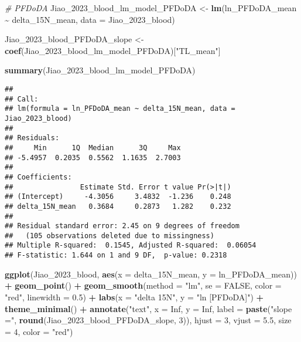 \documentclass[
]{article}
\newenvironment{Shaded}{\begin{snugshade}}{\end{snugshade}}
\newcommand{\AttributeTok}[1]{\textcolor[rgb]{0.13,0.29,0.53}{#1}}
\newcommand{\CommentTok}[1]{\textcolor[rgb]{0.56,0.35,0.01}{\textit{#1}}}
\newcommand{\ConstantTok}[1]{\textcolor[rgb]{0.56,0.35,0.01}{#1}}
\newcommand{\DecValTok}[1]{\textcolor[rgb]{0.00,0.00,0.81}{#1}}
\newcommand{\FloatTok}[1]{\textcolor[rgb]{0.00,0.00,0.81}{#1}}
\newcommand{\FunctionTok}[1]{\textcolor[rgb]{0.13,0.29,0.53}{\textbf{#1}}}
\newcommand{\NormalTok}[1]{#1}
\newcommand{\OtherTok}[1]{\textcolor[rgb]{0.56,0.35,0.01}{#1}}
\newcommand{\SpecialCharTok}[1]{\textcolor[rgb]{0.81,0.36,0.00}{\textbf{#1}}}
\newcommand{\StringTok}[1]{\textcolor[rgb]{0.31,0.60,0.02}{#1}}
\begin{document}
\begin{Shaded}
\begin{Highlighting}[]
\CommentTok{\# PFDoDA}
\NormalTok{Jiao\_2023\_blood\_lm\_model\_PFDoDA }\OtherTok{\textless{}{-}} \FunctionTok{lm}\NormalTok{(ln\_PFDoDA\_mean }\SpecialCharTok{\textasciitilde{}}\NormalTok{ delta\_15N\_mean,}
                                    \AttributeTok{data =}\NormalTok{ Jiao\_2023\_blood)}

\NormalTok{Jiao\_2023\_blood\_PFDoDA\_slope }\OtherTok{\textless{}{-}} \FunctionTok{coef}\NormalTok{(Jiao\_2023\_blood\_lm\_model\_PFDoDA)[}\StringTok{"TL\_mean"}\NormalTok{]}

\FunctionTok{summary}\NormalTok{(Jiao\_2023\_blood\_lm\_model\_PFDoDA)}
\end{Highlighting}
\end{Shaded}

\begin{verbatim}
## 
## Call:
## lm(formula = ln_PFDoDA_mean ~ delta_15N_mean, data = Jiao_2023_blood)
## 
## Residuals:
##     Min      1Q  Median      3Q     Max 
## -5.4957  0.2035  0.5562  1.1635  2.7003 
## 
## Coefficients:
##                Estimate Std. Error t value Pr(>|t|)
## (Intercept)     -4.3056     3.4832  -1.236    0.248
## delta_15N_mean   0.3684     0.2873   1.282    0.232
## 
## Residual standard error: 2.45 on 9 degrees of freedom
##   (105 observations deleted due to missingness)
## Multiple R-squared:  0.1545, Adjusted R-squared:  0.06054 
## F-statistic: 1.644 on 1 and 9 DF,  p-value: 0.2318
\end{verbatim}

\begin{Shaded}
\begin{Highlighting}[]
\FunctionTok{ggplot}\NormalTok{(Jiao\_2023\_blood, }\FunctionTok{aes}\NormalTok{(}\AttributeTok{x =}\NormalTok{ delta\_15N\_mean, }\AttributeTok{y =}\NormalTok{ ln\_PFDoDA\_mean)) }\SpecialCharTok{+}
  \FunctionTok{geom\_point}\NormalTok{() }\SpecialCharTok{+}
  \FunctionTok{geom\_smooth}\NormalTok{(}\AttributeTok{method =} \StringTok{"lm"}\NormalTok{, }\AttributeTok{se =} \ConstantTok{FALSE}\NormalTok{, }\AttributeTok{color =} \StringTok{"red"}\NormalTok{, }\AttributeTok{linewidth =} \FloatTok{0.5}\NormalTok{) }\SpecialCharTok{+}
  \FunctionTok{labs}\NormalTok{(}\AttributeTok{x =} \StringTok{"delta 15N"}\NormalTok{,}
       \AttributeTok{y =} \StringTok{"ln [PFDoDA]"}\NormalTok{) }\SpecialCharTok{+}
  \FunctionTok{theme\_minimal}\NormalTok{() }\SpecialCharTok{+}
  \FunctionTok{annotate}\NormalTok{(}\StringTok{"text"}\NormalTok{, }\AttributeTok{x =} \ConstantTok{Inf}\NormalTok{, }\AttributeTok{y =} \ConstantTok{Inf}\NormalTok{, }\AttributeTok{label =} \FunctionTok{paste}\NormalTok{(}\StringTok{"slope ="}\NormalTok{, }\FunctionTok{round}\NormalTok{(Jiao\_2023\_blood\_PFDoDA\_slope, }\DecValTok{3}\NormalTok{)), }
           \AttributeTok{hjust =} \DecValTok{3}\NormalTok{, }\AttributeTok{vjust =} \FloatTok{5.5}\NormalTok{, }\AttributeTok{size =} \DecValTok{4}\NormalTok{, }\AttributeTok{color =} \StringTok{"red"}\NormalTok{)}
\end{Highlighting}
\end{Shaded}
\end{document}
